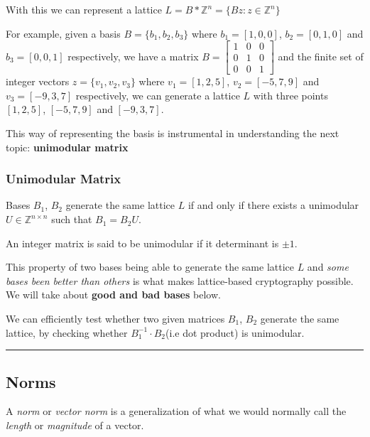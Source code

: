 \documentclass[11pt]{article}
\begin{document}
With this we can represent a lattice
\(L = B * \mathbb{Z}^n = \{Bz: z \in \mathbb{Z}^n \}\)

For example, given a basis \(B = \{b_1, b_2, b_3\}\) where
\(b_1 = [1, 0, 0]\), \(b_2 = [0, 1, 0]\) and \(b_3 = [0, 0, 1]\)
respectively, we have a matrix
\(B = \begin{bmatrix}1 & 0 & 0 \\[0.3em]0 & 1 & 0 \\[0.3em]0 & 0 & 1
\end{bmatrix}\) and the finite set of integer vectors
\(z = \{v_1, v_2, v_3 \}\) where \(v_1 = [1, 2, 5]\),
\(v_2 = [-5, 7, 9]\) and \(v_3 = [-9, 3, 7]\) respectively, we can
generate a lattice \(L\) with three points \([1, 2, 5]\), \([-5, 7, 9]\)
and \([-9, 3, 7]\).

    This way of representing the basis is instrumental in understanding the
next topic: \textbf{unimodular matrix}

    \subsubsection{Unimodular Matrix}\label{unimodular-matrix}

    Bases \(B_1\), \(B_2\) generate the same lattice \(L\) if and only if
there exists a unimodular \(U \in \mathbb{Z}^{n \times n}\) such that
\(B_1 = B_2U\).

An integer matrix is said to be unimodular if it determinant is
\(\pm1\).

This property of two bases being able to generate the same lattice \(L\)
and \emph{some bases been better than others} is what makes
lattice-based cryptography possible. We will take about \textbf{good and
bad bases} below.

We can efficiently test whether two given matrices \(B_1\), \(B_2\)
generate the same lattice, by checking whether \(B_1^{-1}·B_2\)(i.e dot
product) is unimodular.

\begin{center}\rule{0.5\linewidth}{0.5pt}\end{center}

    \subsection{Norms}\label{norms}

    A \emph{norm} or \emph{vector norm} is a generalization of what we would
normally call the \emph{length} or \emph{magnitude} of a vector.
\end{document}
